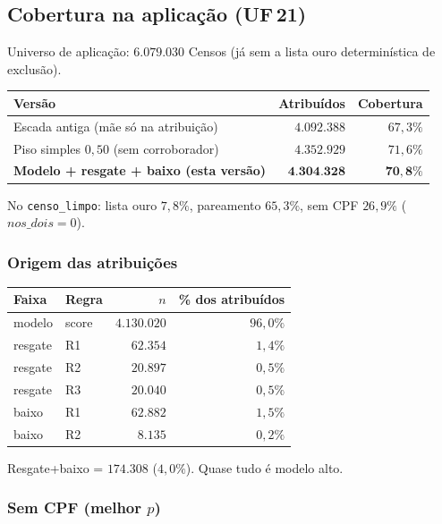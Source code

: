 \documentclass[11pt,a4paper]{article}
\begin{document}
\subsection{Cobertura na aplicação (UF\,21)}

Universo de aplicação: $6{.}079{.}030$ Censos (já sem a lista ouro
determinística de exclusão).

\begin{center}
\begin{tabular}{@{}lrr@{}}
\toprule
Versão & Atribuídos & Cobertura \\
\midrule
Escada antiga (mãe só na atribuição) & $4{.}092{.}388$ & $67{,}3\%$ \\
Piso simples $0{,}50$ (sem corroborador) & $4{.}352{.}929$ & $71{,}6\%$ \\
\textbf{Modelo + resgate + baixo (esta versão)} & $\mathbf{4{.}304{.}328}$ & $\mathbf{70{,}8\%}$ \\
\bottomrule
\end{tabular}
\end{center}

No \texttt{censo\_limpo}: lista ouro $7{,}8\%$, pareamento $65{,}3\%$, sem CPF
$26{,}9\%$ ($nos\_dois = 0$).

\subsubsection{Origem das atribuições}

\begin{center}
\begin{tabular}{@{}llrr@{}}
\toprule
Faixa & Regra & $n$ & \% dos atribuídos \\
\midrule
modelo & score & $4{.}130{.}020$ & $96{,}0\%$ \\
resgate & R1 & $62{.}354$ & $1{,}4\%$ \\
resgate & R2 & $20{.}897$ & $0{,}5\%$ \\
resgate & R3 & $20{.}040$ & $0{,}5\%$ \\
baixo & R1 & $62{.}882$ & $1{,}5\%$ \\
baixo & R2 & $8{.}135$ & $0{,}2\%$ \\
\bottomrule
\end{tabular}
\end{center}

Resgate+baixo = $174{.}308$ ($4{,}0\%$). Quase tudo é modelo alto.

\subsubsection{Sem CPF (melhor $p$)}
\end{document}
